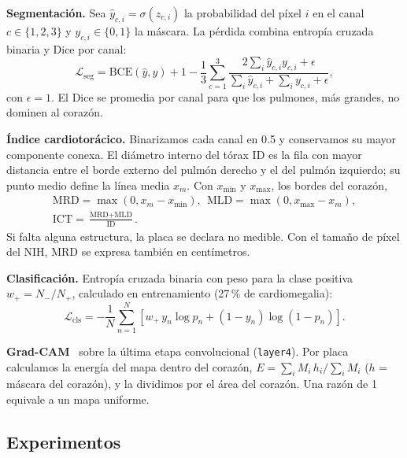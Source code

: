 \documentclass[conference]{IEEEtran}
\begin{document}
\textbf{Segmentación.} Sea $\hat{y}_{c,i}=\sigma(z_{c,i})$ la probabilidad del píxel $i$ en el canal
$c\in\{1,2,3\}$ y $y_{c,i}\in\{0,1\}$ la máscara. La pérdida combina entropía cruzada binaria y Dice por canal:
\begin{equation}
\mathcal{L}_{\text{seg}} = \text{BCE}(\hat{y},y) + 1 - \frac{1}{3}\sum_{c=1}^{3}
\frac{2\sum_i \hat{y}_{c,i}y_{c,i}+\epsilon}{\sum_i \hat{y}_{c,i}+\sum_i y_{c,i}+\epsilon},
\end{equation}
con $\epsilon=1$. El Dice se promedia por canal para que los pulmones, más grandes, no dominen al corazón.

\textbf{Índice cardiotorácico.} Binarizamos cada canal en 0.5 y conservamos su mayor componente conexa. El diámetro
interno del tórax ID es la fila con mayor distancia entre el borde externo del pulmón derecho y el del pulmón
izquierdo; su punto medio define la línea media $x_m$. Con $x_{\min}$ y $x_{\max}$, los bordes del corazón,
\begin{gather}
\text{MRD}=\max(0,x_m-x_{\min}),\ \ \text{MLD}=\max(0,x_{\max}-x_m),\\
\text{ICT}=\frac{\text{MRD}+\text{MLD}}{\text{ID}}.
\end{gather}
Si falta alguna estructura, la placa se declara no medible. Con el tamaño de píxel del NIH, MRD se expresa también en
centímetros.

\textbf{Clasificación.} Entropía cruzada binaria con peso para la clase positiva
$w_+=N_-/N_+$, calculado en entrenamiento (27\,\% de cardiomegalia):
\begin{equation}
\mathcal{L}_{\text{cls}} = -\frac{1}{N}\sum_{n=1}^{N}\left[w_+\,y_n\log p_n + (1-y_n)\log(1-p_n)\right].
\end{equation}

\textbf{Grad-CAM}~\cite{selvaraju2017gradcam} sobre la última etapa convolucional (\texttt{layer4}). Por placa
calculamos la energía del mapa dentro del corazón, $E=\sum_i M_i\,h_i/\sum_i M_i$ ($h$ = máscara del corazón), y la
dividimos por el área del corazón. Una razón de 1 equivale a un mapa uniforme.

\subsection{Experimentos}
\end{document}
